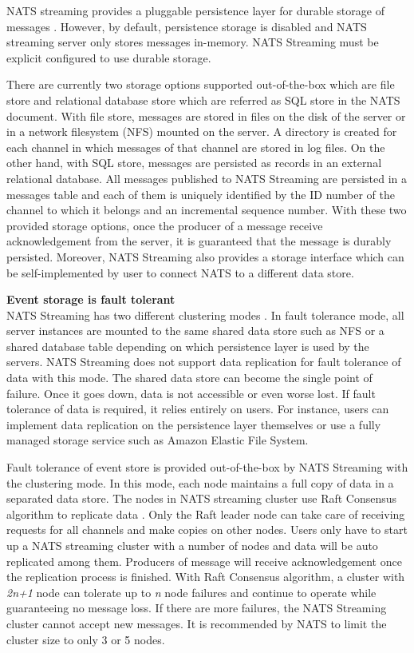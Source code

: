 NATS streaming provides a pluggable persistence layer for durable storage of messages \cite{natsconfiguring}. However, by default, persistence storage is disabled and NATS streaming server only stores messages in-memory. NATS Streaming must be explicit configured to use durable storage. 

There are currently two storage options supported out-of-the-box which are file store and relational database store which are referred as SQL store in the NATS document. With file store, messages are stored in files on the disk of the server or in a network filesystem (NFS) mounted on the server. A directory is created for each channel in which messages of that channel are stored in log files. On the other hand, with SQL store, messages are persisted as records in an external relational database. All messages published to NATS Streaming are persisted in a messages table and each of them is uniquely identified by the ID number of the channel to which it belongs and an incremental sequence number. With these two provided storage options, once the producer of a message receive acknowledgement from the server, it is guaranteed that the message is durably persisted. Moreover, NATS Streaming also provides a storage interface which can be self-implemented by user to connect NATS to a different data store. 

\textbf{Event storage is fault tolerant}\\
NATS Streaming has two different clustering modes \cite{natsstreaming}. In fault tolerance mode, all server instances are mounted to the same shared data store such as NFS or a shared database table depending on which persistence layer is used by the servers. NATS Streaming does not support data replication for fault tolerance of data with this mode. The shared data store can become the single point of failure. Once it goes down, data is not accessible or even worse lost. If fault tolerance of data is required, it relies entirely on users. For instance, users can implement data replication on the persistence layer themselves or use a fully managed storage service such as Amazon Elastic File System. 

Fault tolerance of event store is provided out-of-the-box by NATS Streaming with the clustering mode. In this mode, each node maintains a full copy of data in a separated data store. The nodes in NATS streaming cluster use Raft Consensus algorithm to replicate data \cite{raftalg}. Only the Raft leader node can take care of receiving requests for all channels and make copies on other nodes. Users only have to start up a NATS streaming cluster with a number of nodes and data will be auto replicated among them. Producers of message will receive acknowledgement once the replication process is finished. With Raft Consensus algorithm, a cluster with \emph{2n+1} node can tolerate up to \emph{n} node failures and continue to operate while guaranteeing no message loss. If there are more failures, the NATS Streaming cluster cannot accept new messages. It is recommended by NATS to limit the cluster size to only 3 or 5 nodes.


